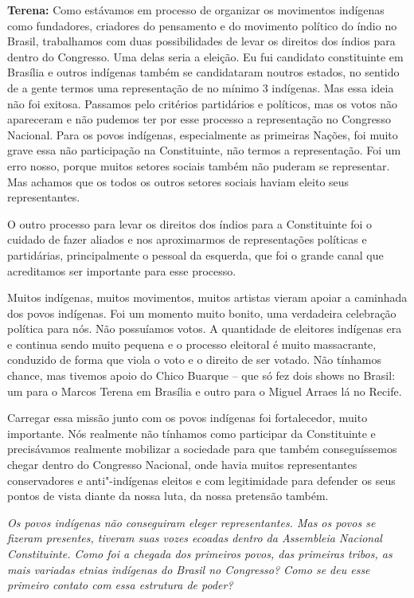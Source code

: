 \textbf{Terena:} Como estávamos em processo de organizar os movimentos
indígenas como fundadores, criadores do pensamento e do movimento
político do índio no Brasil, trabalhamos com duas possibilidades de
levar os direitos dos índios para dentro do Congresso. Uma delas seria a
eleição. Eu fui candidato constituinte em Brasília e outros indígenas
também se candidataram noutros estados, no sentido de a gente termos uma
representação de no mínimo 3 indígenas. Mas essa ideia não foi exitosa.
Passamos pelo critérios partidários e políticos, mas os votos não
apareceram e não pudemos ter por esse processo a representação no
Congresso Nacional. Para os povos indígenas, especialmente as primeiras
Nações, foi muito grave essa não participação na Constituinte, não
termos a representação. Foi um erro nosso, porque muitos setores sociais
também não puderam se representar. Mas achamos que os todos os outros
setores sociais haviam eleito seus representantes.

O outro processo para levar os direitos dos índios para a Constituinte
foi o cuidado de fazer aliados e nos aproximarmos de representações
políticas e partidárias, principalmente o pessoal da esquerda, que foi o
grande canal que acreditamos ser importante para esse processo.

Muitos indígenas, muitos movimentos, muitos artistas vieram apoiar a
caminhada dos povos indígenas. Foi um momento muito bonito, uma
verdadeira celebração política para nós. Não possuíamos votos. A
quantidade de eleitores indígenas era e continua sendo muito pequena e o
processo eleitoral é muito massacrante, conduzido de forma que viola o
voto e o direito de ser votado. Não tínhamos chance, mas tivemos apoio
do Chico Buarque -- que só fez dois shows no Brasil: um para o Marcos
Terena em Brasília e outro para o Miguel Arraes lá no Recife.

Carregar essa missão junto com os povos indígenas foi fortalecedor,
muito importante. Nós realmente não tínhamos como participar da
Constituinte e precisávamos realmente mobilizar a sociedade para que
também conseguíssemos chegar dentro do Congresso Nacional, onde havia
muitos representantes conservadores e anti"-indígenas eleitos e com
legitimidade para defender os seus pontos de vista diante da nossa luta,
da nossa pretensão também.

\emph{Os povos indígenas não conseguiram eleger representantes. Mas os
povos se fizeram presentes, tiveram suas vozes ecoadas dentro da
Assembleia Nacional Constituinte. Como foi a chegada dos primeiros
povos, das primeiras tribos, as mais variadas etnias indígenas do Brasil
no Congresso? Como se deu esse primeiro contato com essa estrutura de
poder?}

